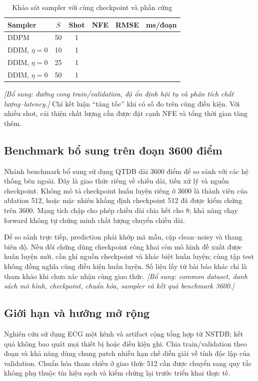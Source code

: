 \documentclass[conference]{IEEEtran}
\newcommand{\pending}{\textemdash}
\newcommand{\draftnote}[1]{\textit{[Bổ sung: #1]}}
\begin{document}
\begin{table}[t]
 \caption{Khảo sát sampler với cùng checkpoint và phần cứng}
 \label{tab:ddimresults}
 \centering\small
 \begin{tabular}{@{}lccccc@{}}
 \toprule
 Sampler & $S$ & Shot & NFE & RMSE & ms/đoạn\\
 \midrule
 DDPM & 50 & 1 & \pending & \pending & \pending\\
 DDIM, $\eta=0$ & 10 & 1 & \pending & \pending & \pending\\
 DDIM, $\eta=0$ & 25 & 1 & \pending & \pending & \pending\\
 DDIM, $\eta=0$ & 50 & 1 & \pending & \pending & \pending\\
 \bottomrule
 \end{tabular}
\end{table}

\draftnote{đường cong train/validation, độ ổn định hội tụ và phân tích chất lượng--latency.} Chỉ kết luận ``tăng tốc'' khi có số đo trên cùng điều kiện. Với nhiều shot, cải thiện chất lượng cần được đặt cạnh NFE và tổng thời gian tăng thêm.

\subsection{Benchmark bổ sung trên đoạn 3600 điểm}
\label{sec:benchmark3600}
Nhánh benchmark bổ sung sử dụng QTDB dài 3600 điểm để so sánh với các hệ thống bên ngoài. Đây là giao thức riêng về chiều dài, tiền xử lý và nguồn checkpoint. Không mô tả checkpoint huấn luyện riêng ở 3600 là thành viên của ablation 512, hoặc mặc nhiên khẳng định checkpoint 512 đã được kiểm chứng trên 3600. Mạng tích chập cho phép chiều dài chia hết cho 8; khả năng chạy forward không tự chứng minh chất lượng chuyển chiều dài.

Để so sánh trực tiếp, prediction phải khớp mã mẫu, cặp clean--noisy và thang biên độ. Nếu đối chứng dùng checkpoint công khai còn mô hình đề xuất được huấn luyện mới, cần ghi nguồn checkpoint và khác biệt huấn luyện; cùng tập test không đồng nghĩa cùng điều kiện huấn luyện. Số liệu lấy từ bài báo khác chỉ là tham khảo khi chưa xác nhận cùng giao thức. \draftnote{common dataset, danh sách mô hình, checkpoint, chuẩn hóa, sampler và kết quả benchmark 3600.}

\subsection{Giới hạn và hướng mở rộng}
Nghiên cứu sử dụng ECG một kênh và artifact cộng tổng hợp từ NSTDB; kết quả không bao quát mọi thiết bị hoặc điều kiện ghi. Chia train/validation theo đoạn và khả năng dùng chung patch nhiễu hạn chế diễn giải về tính độc lập của validation. Chuẩn hóa tham chiếu ở giao thức 512 cần được chuyển sang quy tắc không phụ thuộc tín hiệu sạch và kiểm chứng lại trước triển khai thực tế.
\end{document}
